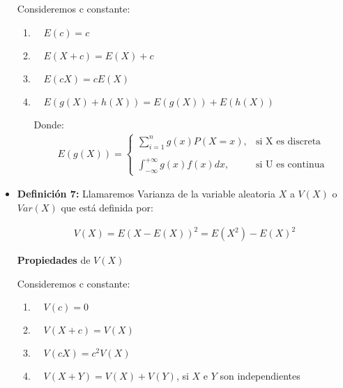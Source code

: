 \documentclass{templateNote}
\begin{document}
\begin{itemize}
    Consideremos c constante:

    \begin{enumerate}
        \item $\quad E(c) = c$
        
        \item $\quad E(X + c) = E(X) + c$
        
        \item $\quad E(cX) = cE(X)$
        
        \item $\quad E(g(X) + h(X)) = E(g(X)) + E(h(X))$
        
        Donde:
        \begin{align*}
            E(g(X)) = 
            \begin{cases}
                \displaystyle\sum_{i=1}^{n}{g(x)P(X=x)}, 
                & \text{si X es discreta} \\
                \\
                \displaystyle\int_{-\infty}^{+\infty}{g(x)f(x)dx},
                & \text{si U es continua}
            \end{cases}
        \end{align*}
    \end{enumerate}

    \item \textbf{Definición 7:} Llamaremos Varianza de la variable aleatoria $X$ a $V(X)$ o $Var(X)$ que está definida
    por:

    \begin{align*}
        V(X) = E(X - E(X))^2 = E(X^2) - E(X)^2
    \end{align*}

    \textbf{Propiedades} de $V(X)$

    Consideremos c constante:
    \begin{enumerate}
        \item $\quad V(c) = 0$
        \item $\quad V(X + c) = V(X)$
        \item $\quad V(cX) = c^2V(X)$
        \item $\quad V(X + Y) = V(X) + V(Y)$, si $X$ e $Y$ son independientes
    \end{enumerate}
    
\end{itemize}
\end{document}
